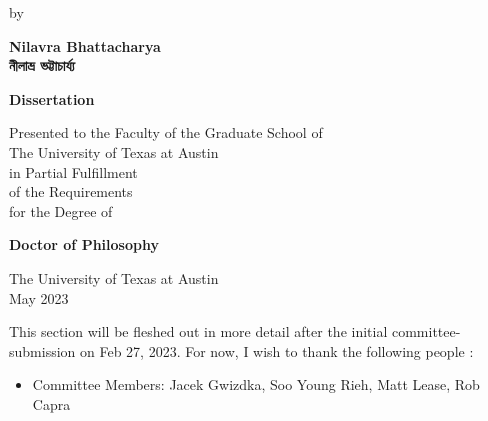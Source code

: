 \documentclass[letterpaper, nobind]{templates/ociamthesis}
\providecommand{\tightlist}{%
  \setlength{\itemsep}{0pt}\setlength{\parskip}{0pt}}
\begin{document}
\begin{romanpages}
\begin{center}
  \vspace*{24pt}

  \begin{spacing}{1.4}
    by\\
    
    \vspace*{24pt}
    
    {\Large{\textbf{
      Nilavra Bhattacharya\\
      নীলাভ্র ভট্টাচার্য্য
    }}}\\
    
    \vspace*{72pt}
    
    {\Large{\textbf{Dissertation}}}\\
    
    \vspace*{24pt}
    
    Presented to the Faculty of the Graduate School of\\
    The University of Texas at Austin\\
    in Partial Fulfillment\\
    of the Requirements\\
    for the Degree of\\
    
    \vspace*{30pt}
    
    {\Large{\textbf{Doctor of Philosophy}}}\\
    
    \vfill

    {\large{The University of Texas at Austin\\
    May 2023}}

  \end{spacing}
\end{center}







\begin{acknowledgements}
 	This section will be fleshed out in more detail after the initial committee-submission on Feb 27, 2023.
 For now, I wish to thank the following people :

 \begin{itemize}
 \tightlist
 \item
   Committee Members: Jacek Gwizdka, Soo Young Rieh, Matt Lease, Rob Capra
 \end{itemize}
\end{acknowledgements}




\end{romanpages}
\end{document}
